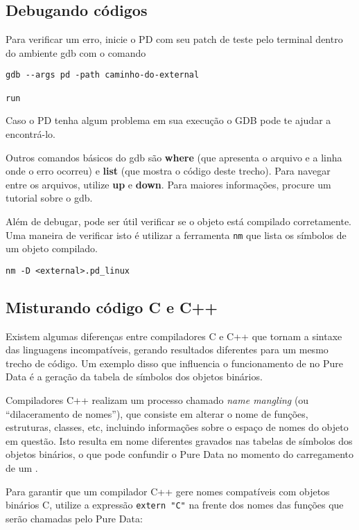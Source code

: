 \subsection{Debugando códigos}

Para verificar um erro, inicie o PD com seu patch de teste pelo terminal dentro do 
ambiente gdb com o comando

\begin{lstlisting}
gdb --args pd -path caminho-do-external

run
\end{lstlisting}
Caso o PD tenha algum problema em sua execução o GDB pode te ajudar a encontrá-lo.

Outros comandos básicos do gdb são \textbf{where} (que apresenta o arquivo e a linha onde
o erro ocorreu) e \textbf{list} (que mostra o código deste trecho).
Para navegar entre os arquivos, utilize \textbf{up} e \textbf{down}.
Para maiores informações, procure um tutorial sobre o gdb.

Além de debugar, pode ser útil verificar se o objeto está compilado corretamente.
Uma maneira de verificar isto é utilizar a ferramenta \texttt{nm} que lista os
símbolos de um objeto compilado.

\begin{lstlisting}
nm -D <external>.pd_linux
\end{lstlisting}

\subsection{Misturando código C e C++}

Existem algumas diferenças entre compiladores C e C++ que tornam a sintaxe das
linguagens incompatíveis, gerando resultados diferentes para um mesmo trecho
de código. Um exemplo disso que influencia o funcionamento de \externals no
Pure Data é a geração da tabela de símbolos dos objetos binários.

Compiladores C++ realizam um processo chamado \emph{name mangling} (ou
``dilaceramento de nomes''), que consiste em alterar o nome de funções,
estruturas, classes, etc, incluindo informações sobre o espaço de nomes do
objeto em questão. Isto resulta em nome diferentes gravados nas tabelas de
símbolos dos objetos binários, o que pode confundir o Pure Data no momento do
carregamento de um \external.

Para garantir que um compilador C++ gere nomes compatíveis com objetos
binários C, utilize a expressão \texttt{extern "C"} na frente dos nomes das
funções que serão chamadas pelo Pure Data:

